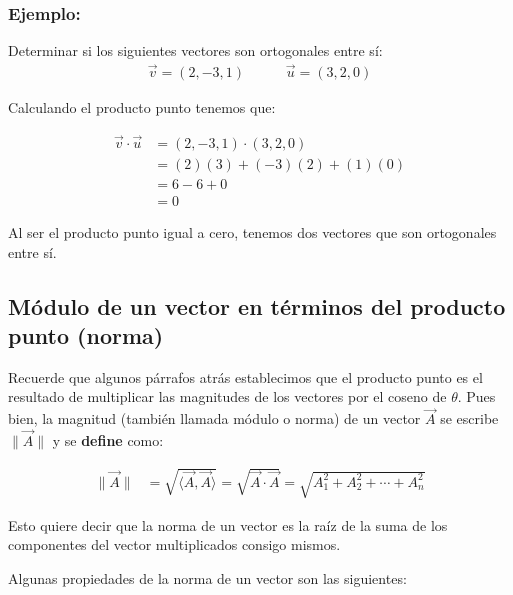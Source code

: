 \documentclass{article}
\begin{document}
        \subsubsection*{Ejemplo:}

            Determinar si los siguientes vectores son ortogonales entre sí:
            \begin{gather*}
                \vec{v}=(2,-3,1) \hspace{35pt} \vec{u}=(3,2,0)
            \end{gather*}

            Calculando el producto punto tenemos que:

            \begin{equation*}
                \begin{aligned}
                    \vec{v} \cdot \vec{u} &=(2,-3,1) \cdot(3,2,0) \\
                    &=(2)(3)+(-3)(2)+(1)(0) \\
                    &=6-6+0 \\
                    &=0
                \end{aligned}
            \end{equation*}

            Al ser el producto punto igual a cero, tenemos dos vectores que son ortogonales entre sí.
    
    \subsection{Módulo de un vector en términos del producto punto (norma)}

        Recuerde que algunos párrafos atrás establecimos que el producto punto es el resultado de multiplicar las magnitudes de los vectores por el coseno de $\theta$. Pues bien, la magnitud (también llamada módulo o norma) de un vector $\vec{A}$ se escribe $\parallel\vec{A}\parallel$ y se \textbf{define} como:

        \begin{align}
            \parallel \vec{A}\parallel &= \sqrt{\langle \vec{A}, \vec{A}\rangle} = \sqrt{\vec{A} \cdot \vec{A}} = \sqrt{A_{1}^{2}+A_{2}^{2}+\cdots+A_{n}^{2}}
        \end{align}

        Esto quiere decir que la norma de un vector es la raíz de la suma de los componentes del vector multiplicados consigo mismos.

        Algunas propiedades de la norma de un vector son las siguientes:
\end{document}
